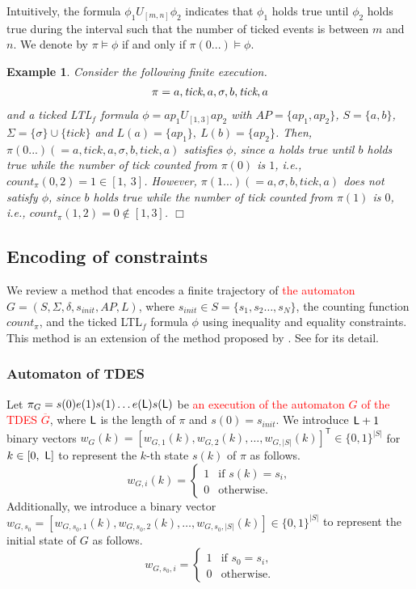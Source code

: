 \documentclass{article}
\newcommand{\qedwhite}{\hfill \ensuremath{\Box}}
\newtheorem{exa}{Example}
\newcommand{\Len}{{\sf L}}
\newcommand{\red}[1]{\textcolor{red}{#1}}
\begin{document}
Intuitively, the formula $\phi_1 U_{[m,n]}  \phi_2$ indicates that $\phi_1$ holds true until $\phi_2$ holds true during the interval such that the number of ticked events is between $m$ and $n$. 
We denote by $\pi \models \phi$ if and only if $\pi (0...) \models \phi$.

\begin{exa}
Consider the following finite execution.
\begin{align}
\pi=a,\textit{tick},a,\sigma,b,\textit{tick},a \notag
\end{align}
and a ticked LTL$_f$ formula $\phi=ap_1 U_{[1,3]} ap_2$ with $AP=\{ap_1,ap_2\}$, $S=\{a,b\}$, $\Sigma=\{\sigma\}\cup\{\textit{tick}\}$ and $L(a)=\{ap_1\},\ L(b)=\{ap_2\}$. Then, $\pi(0...) (= a,\textit{tick},a,\sigma,b,\textit{tick},a)$ satisfies $\phi$, since $a$ holds true until $b$ holds true while the number of \textit{tick} counted from $\pi(0)$ is $1$, i.e., $count_{\pi}(0, 2) = 1 \in[ 1,\ 3]$. However, $\pi (1...) (= a,\sigma,b,\textit{tick},a)$ does \textit{not} satisfy $\phi$, since $b$ holds true while the number of \textit{tick} counted from $\pi(1)$ is $0$, i.e., $count_{\pi}(1, 2) = 0 \notin [1, 3]$. \qedwhite 
\end{exa}


\subsection{Encoding of constraints}\label{encode}
%
We review a method that encodes a finite trajectory of \red{the automaton} $G=(S, \Sigma, \delta, s_{init}, AP, L)$, where $s_{init} \in S= \{s_1, s_2 \ldots, s_{N} \}$, the counting function $count_\pi$, and the ticked LTL$_f$ formula $\phi$ using inequality and equality constraints.
This method is an extension of the method proposed by \cite{BHJLS2006}.  See \cite{KHU2020} for its detail.
%
\subsubsection{Automaton of TDES}
Let $\pi_{G}=s(0)e(1)s(1) \ldots e(\Len)s(\Len)$ be \red{an execution of the automaton $G$ of the TDES $\overline{G}$}, where $\Len$ is the length of $\pi$ and $s(0)=s_{init}$.
We introduce $\Len+1$ binary vectors $w_G (k)=[w_{G,1} (k), w_{G,2} (k) , \ldots , w_{G,|S|} (k) ]^{\mathsf{T}} \in \{0, 1\}^{|S|}$ for $k\in [0,\ \Len]$ to represent the $k$-th state $s(k)$ of $\pi$ as follows.
\[
w_{G,i}(k)=\left\{ \begin{array}{ll}
1 & \mbox{if } s(k)=s_i, \\
0 & \mbox{otherwise.}
\end{array} \right.
\]
Additionally, we introduce a binary vector $w_{G,s_0}=[w_{G,s_0,1} (k), w_{G,s_0,2} (k) , \ldots , w_{G,s_0,|S|} (k) ]\in \{0, 1\}^{|S|}$ to represent the initial state of $G$ as follows.
\[
w_{G,s_0,i}=\left\{ \begin{array}{ll}
1 & \mbox{if } s_0=s_i, \\
0 & \mbox{otherwise.}
\end{array} \right.
\]
\end{document}

